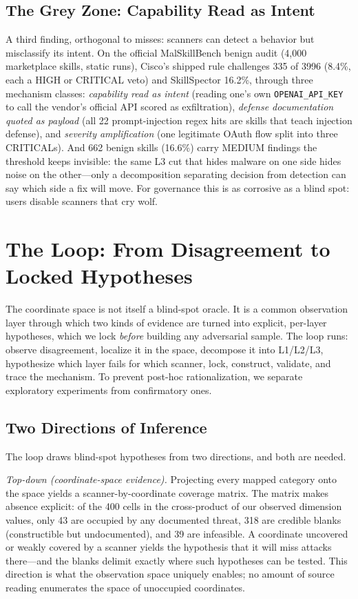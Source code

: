 \documentclass[sigconf,nonacm]{acmart}
\begin{document}
\subsection{The Grey Zone: Capability Read as Intent}
A third finding, orthogonal to misses: scanners can detect a behavior but misclassify its intent. On the official MalSkillBench benign audit (4{,}000 marketplace skills, static runs), Cisco's shipped rule challenges 335 of 3996 (8.4\%, each a HIGH or CRITICAL veto) and SkillSpector 16.2\%, through three mechanism classes: \emph{capability read as intent} (reading one's own \texttt{OPENAI\_API\_KEY} to call the vendor's official API scored as exfiltration), \emph{defense documentation quoted as payload} (all 22 prompt-injection regex hits are skills that teach injection defense), and \emph{severity amplification} (one legitimate OAuth flow split into three CRITICALs). And 662 benign skills (16.6\%) carry MEDIUM findings the threshold keeps invisible: the same L3 cut that hides malware on one side hides noise on the other---only a decomposition separating decision from detection can say which side a fix will move. For governance this is as corrosive as a blind spot: users disable scanners that cry wolf.

\section{The Loop: From Disagreement to Locked Hypotheses}
\label{sec:hypotheses}

The coordinate space is not itself a blind-spot oracle. It is a common observation layer through which two kinds of evidence are turned into explicit, per-layer hypotheses, which we lock \emph{before} building any adversarial sample. The loop runs: observe disagreement, localize it in the space, decompose it into L1/L2/L3, hypothesize which layer fails for which scanner, lock, construct, validate, and trace the mechanism. To prevent post-hoc rationalization, we separate exploratory experiments from confirmatory ones.

\subsection{Two Directions of Inference}
The loop draws blind-spot hypotheses from two directions, and both are needed.

\emph{Top-down (coordinate-space evidence).} Projecting every mapped category onto the space yields a scanner-by-coordinate coverage matrix. The matrix makes absence explicit: of the 400 cells in the cross-product of our observed dimension values, only 43 are occupied by any documented threat, 318 are credible blanks (constructible but undocumented), and 39 are infeasible. A coordinate uncovered or weakly covered by a scanner yields the hypothesis that it will miss attacks there---and the blanks delimit exactly where such hypotheses can be tested. This direction is what the observation space uniquely enables; no amount of source reading enumerates the space of unoccupied coordinates.
\end{document}
